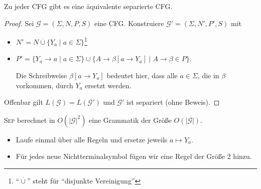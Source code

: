 \begin{lemma}
  Zu jeder \ac{CFG} gibt es eine äquivalente separierte \ac{CFG}.
\end{lemma}
\begin{proof}
  Sei $\mathcal{G} = (\Sigma, N, P, S)$ eine \ac{CFG}.
  Konstruiere $\mathcal{G}' = (\Sigma, N', P', S)$ mit
  \begin{itemize}
  \item $N' = N \overset.\cup \{Y_a \mid a \in \Sigma \}$\footnote{"`$\overset.\cup$"' steht für "`disjunkte Vereinigung"'}
  \item $P' = \{Y_a \to a \mid a \in \Sigma \} \cup \{A \to \beta[a \to Y_a] \mid A \to \beta \in P \}$.
  
    Die Schreibweise $\beta[a\to Y_a]$ bedeutet hier, dass alle $a \in \Sigma$, die in $\beta$ vorkommen, durch $Y_a$ ersetzt werden.
  \end{itemize}
  Offenbar gilt $L(\mathcal{G}) = L(\mathcal{G'})$ und $\mathcal{G}'$ ist separiert (ohne Beweis).
\end{proof}
\begin{Bemerkung}
\textsc{Sep} berechnet in $O(|\mathcal{G}|^2)$ eine Grammatik der Größe $O(|\mathcal{G}|)$.
\begin{itemize}
	\item Laufe einmal über alle Regeln und ersetze jeweils $a
          \mapsto Y_a$.
	
	\item Für jedes neue Nichtterminalsymbol fügen wir eine Regel der Größe 2 hinzu.
	\qedhere
\end{itemize}
\end{Bemerkung}




